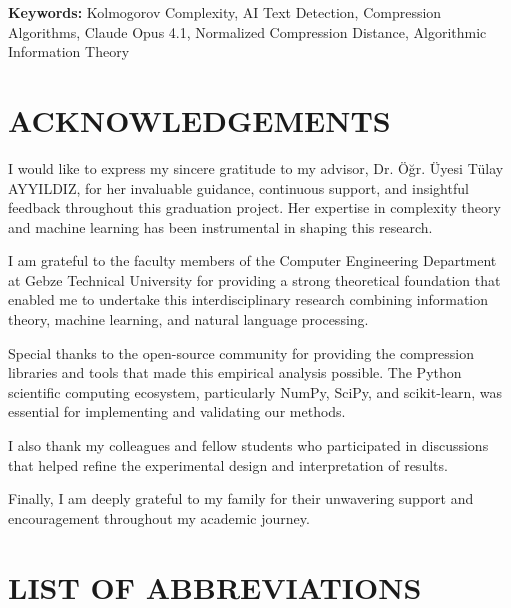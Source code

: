 \documentclass[12pt,a4paper]{report}
\begin{document}
\textbf{Keywords:} Kolmogorov Complexity, AI Text Detection, Compression Algorithms, Claude Opus 4.1, Normalized Compression Distance, Algorithmic Information Theory


\chapter*{ACKNOWLEDGEMENTS}

I would like to express my sincere gratitude to my advisor, Dr. \"O\u{g}r. \"Uyesi T\"ulay AYYILDIZ, for her invaluable guidance, continuous support, and insightful feedback throughout this graduation project. Her expertise in complexity theory and machine learning has been instrumental in shaping this research.

I am grateful to the faculty members of the Computer Engineering Department at Gebze Technical University for providing a strong theoretical foundation that enabled me to undertake this interdisciplinary research combining information theory, machine learning, and natural language processing.

Special thanks to the open-source community for providing the compression libraries and tools that made this empirical analysis possible. The Python scientific computing ecosystem, particularly NumPy, SciPy, and scikit-learn, was essential for implementing and validating our methods.

I also thank my colleagues and fellow students who participated in discussions that helped refine the experimental design and interpretation of results.

Finally, I am deeply grateful to my family for their unwavering support and encouragement throughout my academic journey.

\tableofcontents
{}

\listoffigures
{}

\listoftables
{}

\chapter*{LIST OF ABBREVIATIONS}
\end{document}
